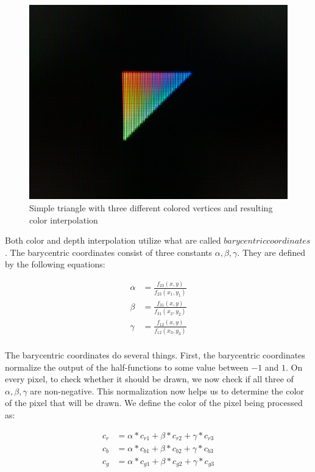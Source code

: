 \documentclass[letterpaper,10pt]{article}
\begin{document}
\begin{figure}[h!]
\begin{center}
\includegraphics[scale=.80]{first_success.png}
\end{center}
\caption{Simple triangle with three different colored vertices and resulting color interpolation}
\label{fig:color_interpolation}
\end{figure}

Both color and depth interpolation utilize what are called $barycentric coordinates$. The barycentric coordinates consist of three constants $\alpha, \beta, \gamma$. They are defined by the following equations:

\begin{align*}
   \alpha &= \frac{f_{23}(x,y)}{f_{23}(x_1,y_1)}   \\
   \beta &= \frac{f_{31}(x,y)}{f_{31}(x_2,y_2)}    \\
   \gamma &= \frac{f_{12}(x,y)}{f_{12}(x_3,y_3)}  \\
\end{align*}

The barycentric coordinates do several things. First, the barycentric coordinates normalize the output of the half-functions to some value between $-1$ and $1$. On every pixel, to check whether it should be drawn, we now check if all three of $\alpha, \beta, \gamma$ are non-negative. This normalization now helps us to determine the color of the pixel that will be drawn. We define the color of the pixel being processed as:

\begin{align*}
    c_{r} &= \alpha*c_{r1} + \beta*c_{r2} + \gamma*c_{r3}					\\
    c_{b} &= \alpha*c_{b1} + \beta*c_{b2} + \gamma*c_{b3}					\\
    c_{g} &= \alpha*c_{g1} + \beta*c_{g2} + \gamma*c_{g3} \\
\end{align*}
\end{document}
